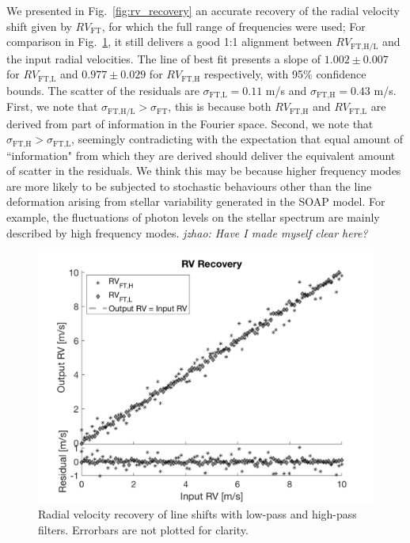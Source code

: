 We presented in Fig.~\ref{fig:rv_recovery} an accurate recovery of the radial velocity shift given by $RV_\text{FT}$, for which the full range of frequencies were used; For comparison in Fig.~\ref{fig:rv_recovery_LH}, it still delivers a good 1:1 alignment between $RV_\text{FT,H/L}$ and the input radial velocities. The line of best fit presents a slope of $1.002\pm0.007$ for $RV_\text{FT,L}$ and $0.977\pm0.029$ for $RV_\text{FT,H}$ respectively, with 95\% confidence bounds. The scatter of the residuals are $\sigma_\text{FT,L} = 0.11$ m/s and $\sigma_\text{FT,H} = 0.43$ m/s. First, we note that $\sigma_\text{FT,H/L} > \sigma_\text{FT}$, this is because both $RV_\text{FT,H}$ and $RV_\text{FT,L}$ are derived from part of information in the Fourier space. Second, we note that $\sigma_\text{FT,H} > \sigma_\text{FT,L}$, seemingly contradicting with the expectation that equal amount of ``information" from which they are derived should deliver the equivalent amount of scatter in the residuals. We think this may be because higher frequency modes are more likely to be subjected to stochastic behaviours other than the line deformation arising from stellar variability generated in the SOAP model. For example, the fluctuations of photon levels on the stellar spectrum are mainly described by high frequency modes. {\em jzhao: Have I made myself clear here?}

\begin{figure}[tbp]
\centering
\includegraphics[width = 0.7 \linewidth]
{./Figures/Methods/5-LINE_SHIFT_ONLY-HL.png}
\caption[Low-pass and high-pass radial velocities]
{Radial velocity recovery of line shifts with low-pass and high-pass filters. Errorbars are not plotted for clarity.}
\label{fig:rv_recovery_LH}
\end{figure} 
\FloatBarrier

